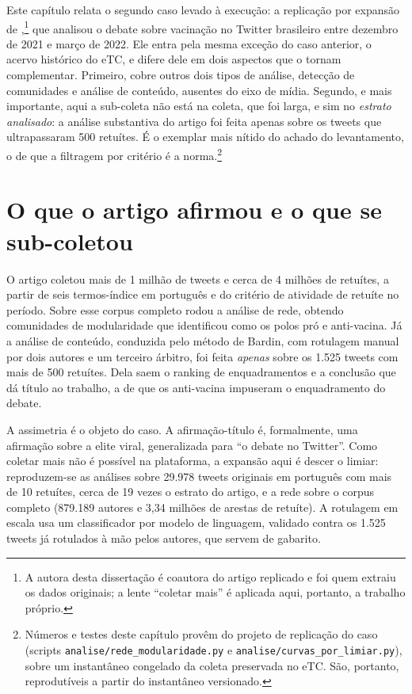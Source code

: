 Este capítulo relata o segundo caso levado à execução: a replicação por expansão
de ,\footnote{A autora desta dissertação é coautora
do artigo replicado e foi quem extraiu os dados originais; a lente ``coletar mais''
é aplicada aqui, portanto, a trabalho próprio.} que analisou o debate sobre
vacinação no Twitter brasileiro entre dezembro de 2021 e março de 2022. Ele entra pela mesma
exceção do caso anterior, o acervo histórico do eTC, e difere dele em dois
aspectos que o tornam complementar. Primeiro, cobre outros dois tipos de análise,
detecção de comunidades e análise de conteúdo, ausentes do eixo de mídia. Segundo,
e mais importante, aqui a sub-coleta não está na coleta, que foi larga, e sim no
\emph{estrato analisado}: a análise substantiva do artigo foi feita apenas sobre
os tweets que ultrapassaram 500 retuítes. É o exemplar mais nítido do achado do
levantamento, o de que a filtragem por critério é a norma.\footnote{Números e testes
deste capítulo provêm do projeto de replicação do caso (scripts
\texttt{analise/rede\_modularidade.py} e \texttt{analise/curvas\_por\_limiar.py}),
sobre um instantâneo congelado da coleta preservada no eTC. São, portanto,
reprodutíveis a partir do instantâneo versionado.}

\section{O que o artigo afirmou e o que se sub-coletou}

O artigo coletou mais de 1 milhão de tweets e cerca de 4 milhões de retuítes, a
partir de seis termos-índice em português e do critério de atividade de retuíte no
período. Sobre esse corpus completo rodou a análise de rede, obtendo comunidades
de modularidade que identificou como os polos pró e anti-vacina. Já a análise de
conteúdo, conduzida pelo método de Bardin, com rotulagem manual por dois autores e
um terceiro árbitro, foi feita \emph{apenas} sobre os 1.525 tweets com mais de 500
retuítes. Dela saem o ranking de enquadramentos e a conclusão que dá título ao
trabalho, a de que os anti-vacina impuseram o enquadramento do debate.

A assimetria é o objeto do caso. A afirmação-título é, formalmente, uma afirmação
sobre a elite viral, generalizada para ``o debate no Twitter''. Como coletar mais
não é possível na plataforma, a expansão aqui é descer o limiar: reproduzem-se as
análises sobre 29.978 tweets originais em português com mais de 10 retuítes, cerca
de 19 vezes o estrato do artigo, e a rede sobre o corpus completo (879.189 autores
e 3,34 milhões de arestas de retuíte). A rotulagem em escala usa um classificador
por modelo de linguagem, validado contra os 1.525 tweets já rotulados à mão pelos
autores, que servem de gabarito.

